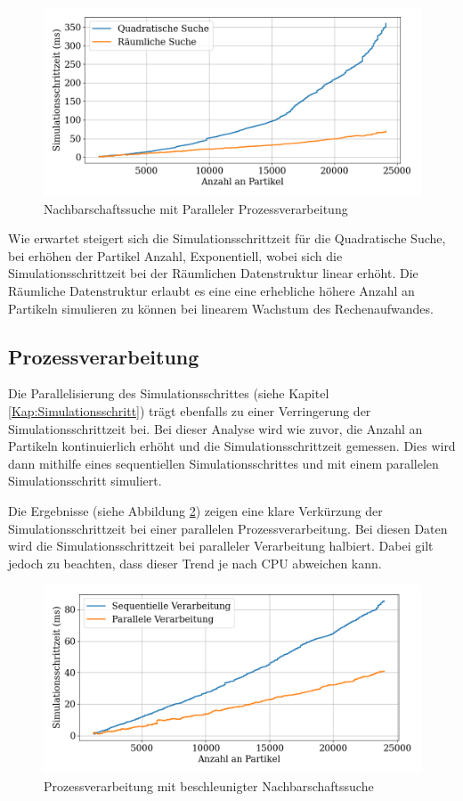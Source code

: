 \documentclass[a4paper, 12pt]{article}
\begin{document}
\begin{figure}[H]
	\centering
	\includegraphics[width=.85\textwidth]{graphics/Nachbarschafts-Suche.png}
	\caption{Nachbarschaftssuche mit Paralleler Prozessverarbeitung}
	\label{NachbarschaftsSuche}
\end{figure}

Wie erwartet steigert sich die Simulationsschrittzeit für die Quadratische Suche, bei erhöhen der Partikel Anzahl, Exponentiell, wobei sich die Simulationsschrittzeit bei der Räumlichen Datenstruktur linear erhöht. Die Räumliche Datenstruktur erlaubt es eine eine erhebliche höhere Anzahl an Partikeln simulieren zu können bei linearem Wachstum des Rechenaufwandes.  

\subsection{Prozessverarbeitung}
Die Parallelisierung des Simulationsschrittes (siehe Kapitel \ref{Kap:Simulationsschritt}) trägt ebenfalls zu einer Verringerung der Simulationsschrittzeit bei. Bei dieser Analyse wird wie zuvor, die Anzahl an Partikeln kontinuierlich erhöht und die Simulationsschrittzeit gemessen. Dies wird dann mithilfe eines sequentiellen Simulationsschrittes und mit einem parallelen Simulationsschritt simuliert.

Die Ergebnisse (siehe Abbildung \ref{Prozessverarbeitung}) zeigen eine klare Verkürzung der Simulationsschrittzeit bei einer parallelen Prozessverarbeitung. Bei diesen Daten wird die Simulationsschrittzeit bei paralleler Verarbeitung halbiert. Dabei gilt jedoch zu beachten, dass dieser Trend je nach CPU abweichen kann.  

\begin{figure}[H]
	\centering
	\includegraphics[width=.85\textwidth]{graphics/Prozessverarbeitung.png}
	\caption{Prozessverarbeitung mit beschleunigter Nachbarschaftssuche}
	\label{Prozessverarbeitung}
\end{figure}
\end{document}
